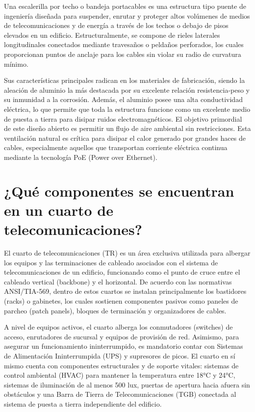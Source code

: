 \documentclass[a4paper,12pt]{article}
\begin{document}
Una escalerilla por techo o bandeja portacables es una estructura tipo puente de ingeniería diseñada para suspender, enrutar y proteger altos volúmenes de medios de telecomunicaciones y de energía a través de los techos o debajo de pisos elevados en un edificio. Estructuralmente, se compone de rieles laterales longitudinales conectados mediante travesaños o peldaños perforados, los cuales proporcionan puntos de anclaje para los cables sin violar su radio de curvatura mínimo.

Sus características principales radican en los materiales de fabricación, siendo la aleación de aluminio la más destacada por su excelente relación resistencia-peso y su inmunidad a la corrosión. Además, el aluminio posee una alta conductividad eléctrica, lo que permite que toda la estructura funcione como un excelente medio de puesta a tierra para disipar ruidos electromagnéticos. El objetivo primordial de este diseño abierto es permitir un flujo de aire ambiental sin restricciones. Esta ventilación natural es crítica para disipar el calor generado por grandes haces de cables, especialmente aquellos que transportan corriente eléctrica continua mediante la tecnología PoE (Power over Ethernet).

\section{¿Qué componentes se encuentran en un cuarto de telecomunicaciones?}

El cuarto de telecomunicaciones (TR) es un área exclusiva utilizada para albergar los equipos y las terminaciones de cableado asociados con el sistema de telecomunicaciones de un edificio, funcionando como el punto de cruce entre el cableado vertical (backbone) y el horizontal. De acuerdo con las normativas ANSI/TIA-569, dentro de estos cuartos se instalan principalmente los bastidores (racks) o gabinetes, los cuales sostienen componentes pasivos como paneles de parcheo (patch panels), bloques de terminación y organizadores de cables.

A nivel de equipos activos, el cuarto alberga los conmutadores (switches) de acceso, enrutadores de sucursal y equipos de provisión de red. Asimismo, para asegurar un funcionamiento ininterrumpido, es mandatorio contar con Sistemas de Alimentación Ininterrumpida (UPS) y supresores de picos. El cuarto en sí mismo cuenta con componentes estructurales y de soporte vitales: sistemas de control ambiental (HVAC) para mantener la temperatura entre 18°C y 24°C, sistemas de iluminación de al menos 500 lux, puertas de apertura hacia afuera sin obstáculos y una Barra de Tierra de Telecomunicaciones (TGB) conectada al sistema de puesta a tierra independiente del edificio.
\end{document}
